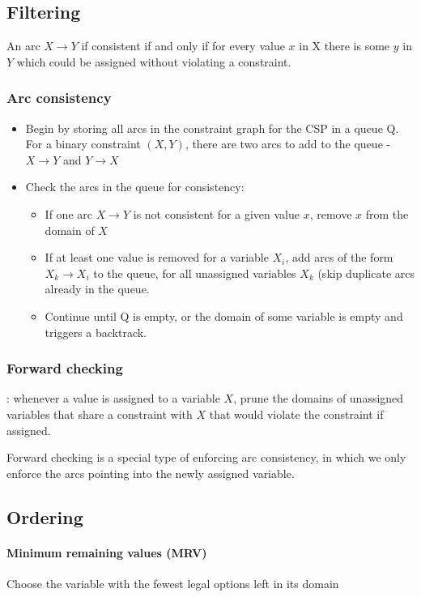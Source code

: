 \subsection{Filtering}

An arc $X \rightarrow Y$ if consistent if and only if for every value $x$ in X there is some $y$ in $Y$  which could be assigned without violating a constraint.

\subsubsection{Arc consistency}
\begin{itemize}
    \item Begin by storing all arcs in the constraint graph for the CSP in a queue Q. For a binary constraint $(X,Y)$, there are two arcs to add to the queue - $X \rightarrow Y$ and $Y \rightarrow X$
    \item Check the arcs in the queue for consistency:
    \begin{itemize}
        \item If one arc $X \rightarrow Y$ is not consistent for a given value $x$, remove $x$ from the domain of $X$
        \item If at least one value is removed for a variable $X_i$, add arcs of the form $X_k \rightarrow X_i$ to the queue, for all unassigned variables $X_k$ (skip duplicate arcs already in the queue.
        \item Continue until Q is empty, or the domain of some variable is empty and triggers a backtrack.
    \end{itemize}
\end{itemize}

\subsubsection{Forward checking}: whenever a value is assigned to a variable $X$, prune the domains of unassigned variables that share a constraint with $X$ that would violate the constraint
if assigned.

Forward checking is a special type of enforcing arc consistency, in which we only enforce the arcs pointing into the newly assigned variable.

\subsection{Ordering}

\paragraph{Minimum remaining values (MRV)} Choose the variable with the fewest legal options left in its domain

